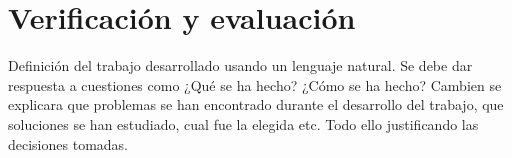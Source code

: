 \chapter{Verificaci\'{o}n y evaluaci\'{o}n}
\newpage
Definición del trabajo desarrollado usando un lenguaje natural. 
Se debe dar respuesta a cuestiones como ¿Qué se ha hecho? 
¿Cómo se ha hecho? Cambien se explicara que problemas se han 
encontrado durante el desarrollo del trabajo, que soluciones 
se han estudiado, cual fue la elegida etc. Todo ello 
justificando las decisiones tomadas.